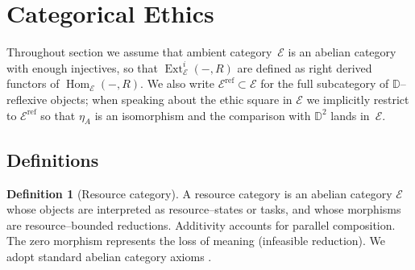 \documentclass[12pt]{article}
\newcommand{\E}{\mathcal{E}}
\newcommand{\DD}{\mathbb{D}}
\newcommand{\Hom}{\operatorname{Hom}}
\newcommand{\Ext}{\operatorname{Ext}}
\theoremstyle{plain}
\theoremstyle{definition}
\newtheorem{definition}[theorem]{Definition}
\theoremstyle{remark}
\numberwithin{equation}{section}
\begin{document}

\section{Categorical Ethics}

Throughout section we assume that ambient category~$\E$ is an abelian category with enough injectives, so that $\Ext^i_\E(-,R)$ are defined as right derived functors of $\Hom_\E(-,R)$. We also write $\E^{\mathrm{ref}}\subset \E$ for the full subcategory of $\DD$–reflexive objects; when speaking about the ethic square in $\E$ we implicitly restrict to $\E^{\mathrm{ref}}$ so that $\eta_A$ is an isomorphism and the comparison with $\DD^2$ lands in~$\E$.

\subsection{Definitions}

\begin{definition}[Resource category]
A resource category is an abelian category \(\E\) whose objects are interpreted as resource--states or tasks, and whose morphisms are resource--bounded reductions. Additivity accounts for parallel composition. The zero morphism represents the loss of meaning (infeasible reduction). We adopt standard abelian category axioms \cite{MacLane1998,Borceux1994}.
\end{definition}
\end{document}

